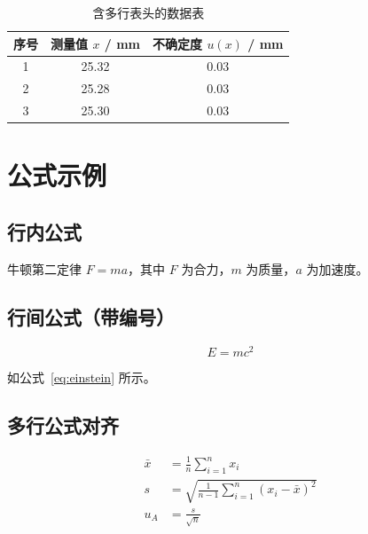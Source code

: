 \documentclass{Phyport}
\begin{document}
\begin{table}[H]
    \centering
    \caption{含多行表头的数据表}
    \label{tab:makecell}
    \begin{tabular}{ccc}
        \toprule
        序号 & \makecell{测量值 \\ $x$ / mm} & \makecell{不确定度 \\ $u(x)$ / mm} \\
        \midrule
        1 & 25.32 & 0.03 \\
        2 & 25.28 & 0.03 \\
        3 & 25.30 & 0.03 \\
        \bottomrule
    \end{tabular}
\end{table}


\section{公式示例}

\subsection{行内公式}

牛顿第二定律 $F = ma$，其中 $F$ 为合力，$m$ 为质量，$a$ 为加速度。

\subsection{行间公式（带编号）}

\begin{equation}
    E = mc^2
    \label{eq:einstein}
\end{equation}

如公式~\eqref{eq:einstein} 所示。

\subsection{多行公式对齐}

\begin{align}
    \bar{x} &= \frac{1}{n} \sum_{i=1}^{n} x_i \label{eq:mean} \\
    s &= \sqrt{\frac{1}{n-1} \sum_{i=1}^{n} (x_i - \bar{x})^2} \label{eq:std} \\
    u_A &= \frac{s}{\sqrt{n}} \label{eq:ua}
\end{align}
\end{document}
